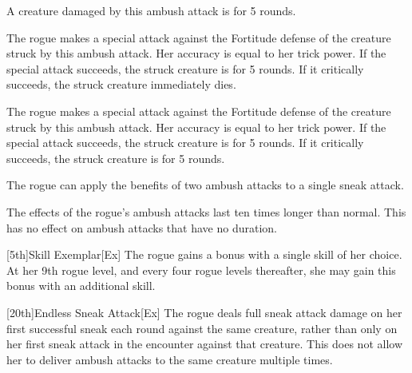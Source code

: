 A creature damaged by this ambush attack is \dazed for 5 rounds.

The rogue makes a special attack against the Fortitude defense of the creature struck by this ambush attack.
Her accuracy is equal to her trick power.
If the special attack succeeds, the struck creature is \staggered for 5 rounds.
If it critically succeeds, the struck creature immediately dies.

The rogue makes a special attack against the Fortitude defense of the creature struck by this ambush attack.
Her accuracy is equal to her trick power.
If the special attack succeeds, the struck creature is \staggered for 5 rounds.
If it critically succeeds, the struck creature is \paralyzed for 5 rounds.


The rogue can apply the benefits of two ambush attacks to a single sneak attack.

The effects of the rogue's ambush attacks last ten times longer than normal.
This has no effect on ambush attacks that have no duration.

[5th]{Skill Exemplar}[Ex]
The rogue gains a  bonus with a single skill of her choice.
At her 9th rogue level, and every four rogue levels thereafter, she may gain this bonus with an additional skill.

[20th]{Endless Sneak Attack}[Ex]
The rogue deals full sneak attack damage on her first successful sneak each round against the same creature, rather than only on her first sneak attack in the encounter against that creature.
This does not allow her to deliver ambush attacks to the same creature multiple times.

